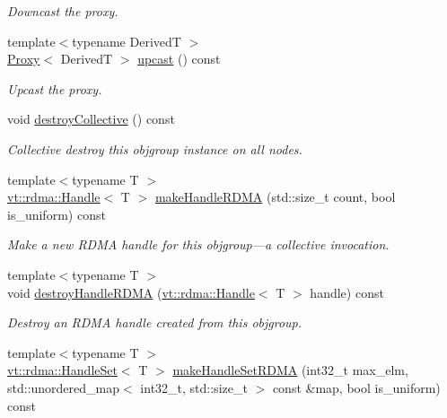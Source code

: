 \begin{DoxyCompactItemize}
\begin{DoxyCompactList}\small\item\em Downcast the proxy. \end{DoxyCompactList}\item 
{\footnotesize template$<$typename DerivedT $>$ }\\\hyperlink{structvt_1_1objgroup_1_1proxy_1_1_proxy}{Proxy}$<$ DerivedT $>$ \hyperlink{structvt_1_1objgroup_1_1proxy_1_1_proxy_a10217747f1bdd8b59e6f5f76290de8e0}{upcast} () const
\begin{DoxyCompactList}\small\item\em Upcast the proxy. \end{DoxyCompactList}\item 
void \hyperlink{structvt_1_1objgroup_1_1proxy_1_1_proxy_a6758c7979d1f69722449cb78f998cbf1}{destroy\+Collective} () const
\begin{DoxyCompactList}\small\item\em Collective destroy this objgroup instance on all nodes. \end{DoxyCompactList}\item 
{\footnotesize template$<$typename T $>$ }\\\hyperlink{structvt_1_1rdma_1_1_handle}{vt\+::rdma\+::\+Handle}$<$ T $>$ \hyperlink{structvt_1_1objgroup_1_1proxy_1_1_proxy_a205119186cc6b5a37d91df8eaac0500f}{make\+Handle\+R\+D\+MA} (std\+::size\+\_\+t count, bool is\+\_\+uniform) const
\begin{DoxyCompactList}\small\item\em Make a new R\+D\+MA handle for this objgroup---a collective invocation. \end{DoxyCompactList}\item 
{\footnotesize template$<$typename T $>$ }\\void \hyperlink{structvt_1_1objgroup_1_1proxy_1_1_proxy_a7510598b2915dec55b90bf9ae61c7df9}{destroy\+Handle\+R\+D\+MA} (\hyperlink{structvt_1_1rdma_1_1_handle}{vt\+::rdma\+::\+Handle}$<$ T $>$ handle) const
\begin{DoxyCompactList}\small\item\em Destroy an R\+D\+MA handle created from this objgroup. \end{DoxyCompactList}\item 
{\footnotesize template$<$typename T $>$ }\\\hyperlink{structvt_1_1rdma_1_1_handle_set}{vt\+::rdma\+::\+Handle\+Set}$<$ T $>$ \hyperlink{structvt_1_1objgroup_1_1proxy_1_1_proxy_a087ce0f4b9d0e6c38a8e5961747ae55c}{make\+Handle\+Set\+R\+D\+MA} (int32\+\_\+t max\+\_\+elm, std\+::unordered\+\_\+map$<$ int32\+\_\+t, std\+::size\+\_\+t $>$ const \&map, bool is\+\_\+uniform) const

\end{DoxyCompactItemize}
